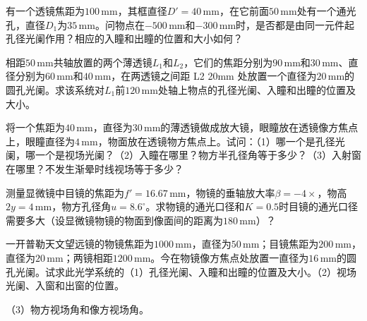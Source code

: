 \documentclass[padl, analysis, notocnum]{ExBook}
\newcommand{\answerarea}[1][3.5cm]{%
  \par\vspace{1mm}%
  \noindent{\color{themeColor!35}\rule{\linewidth}{0.4pt}}\par
  \noindent\begin{minipage}[t][#1][t]{\linewidth}\vspace{0pt}\end{minipage}\par
  \noindent{\color{themeColor!35}\rule{\linewidth}{0.4pt}}\par
}
\begin{document}
\begin{qitems}[startnum=3]
\qitem 有一个透镜焦距为$100\,\mathrm{mm}$，其框直径$D'=40\,\mathrm{mm}$，在它前面$50\,\mathrm{mm}$处有一个通光孔，直径$D_{1}$为$35\,\mathrm{mm}$。问物点在$-500\,\mathrm{mm}$和$-300\,\mathrm{mm}$时，是否都是由同一元件起孔径光阑作用？相应的入瞳和出瞳的位置和大小如何？
\label{q:86:start}
\answerarea[7.0cm]
\label{q:86:end}
\end{qitems}

\begin{qitems}[startnum=4]
\qitem 相距$50\,\mathrm{mm}$共轴放置的两个薄透镜$L_{1}$和$L_{2}$，它们的焦距分别为$90\,\mathrm{mm}$和$30\,\mathrm{mm}$、直径分别为$60\,\mathrm{mm}$和$40\,\mathrm{mm}$，在两透镜之间距 L2 20mm 处放置一个直径为$20\,\mathrm{mm}$的圆孔光阑。求该系统对$L_{1}$前$120\,\mathrm{mm}$处轴上物点的孔径光阑、入瞳和出瞳的位置及大小。
\label{q:87:start}
\answerarea[7.0cm]
\label{q:87:end}
\end{qitems}

\begin{qitems}[startnum=5]
\qitem 将一个焦距为$40\,\mathrm{mm}$，直径为$30\,\mathrm{mm}$的薄透镜做成放大镜，眼瞳放在透镜像方焦点上，眼瞳直径为$4\,\mathrm{mm}$，物面放在透镜物方焦点上。试问：（1）哪一个是孔径光阑，哪一个是视场光阑？（2）入瞳在哪里？物方半孔径角等于多少？（3）入射窗在哪里？不发生渐晕时线视场等于多少？
\label{q:88:start}
\answerarea[7.0cm]
\label{q:88:end}
\end{qitems}

\begin{qitems}[startnum=6]
\qitem 测量显微镜中目镜的焦距为$f'=16.67\,\mathrm{mm}$，物镜的垂轴放大率$\beta =-4\times$，物高$2y=4\,\mathrm{mm}$，物方孔径角$u=8.6^{\circ}$。求物镜的通光口径和$K=0.5$时目镜的通光口径需要多大（设显微镜物镜的物面到像面间的距离为$180\,\mathrm{mm}$）？
\label{q:89:start}
\answerarea[7.0cm]
\label{q:89:end}
\end{qitems}

\begin{qitems}[startnum=7]
\qitem 一开普勒天文望远镜的物镜焦距为$1000\,\mathrm{mm}$，直径为$50\,\mathrm{mm}$；目镜焦距为$200\,\mathrm{mm}$，直径为$20\,\mathrm{mm}$；两镜相距$1200\,\mathrm{mm}$。今在物镜像方焦点处放置一直径为$16\,\mathrm{mm}$的圆孔光阑。试求此光学系统的（1）孔径光阑、入瞳和出瞳的位置及大小。（2）视场光阑、入窗和出窗的位置。
\par\noindent （3）物方视场角和像方视场角。
\label{q:90:start}
\answerarea[7.0cm]
\label{q:90:end}
\end{qitems}
\end{document}
